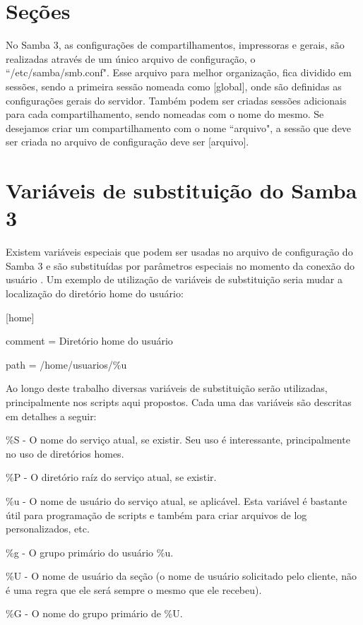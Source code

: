 \section{Seções}

No Samba 3, as configurações de compartilhamentos, impressoras e gerais, são realizadas através de um único arquivo de configuração, o ``/etc/samba/smb.conf". Esse arquivo para melhor organização, fica dividido em sessões, sendo a primeira sessão nomeada como [global], onde são definidas as configurações gerais do servidor. Também podem ser criadas sessões adicionais para cada compartilhamento, sendo nomeadas com o nome do mesmo. Se desejamos criar um compartilhamento com o nome ``arquivo", a sessão que deve ser criada no arquivo de configuração deve ser [arquivo].

\section{Variáveis de substituição do Samba 3}

Existem variáveis especiais que podem ser usadas no arquivo de configuração do Samba 3 e são substituídas por parâmetros especiais no momento da conexão do usuário \cite{FOCA}. Um exemplo de utilização de variáveis de substituição seria mudar a localização do diretório home do usuário:

     [home]

      comment = Diretório home do usuário

      path = /home/usuarios/\%u

Ao longo deste trabalho diversas variáveis de substituição serão utilizadas, principalmente nos scripts aqui propostos. Cada uma das variáveis são descritas em detalhes a seguir:

\%S - O nome do serviço atual, se existir. Seu uso é interessante, principalmente no uso de diretórios homes.

\%P - O diretório raíz do serviço atual, se existir.

\%u - O nome de usuário do serviço atual, se aplicável. Esta variável é bastante útil para programação de scripts e também para criar arquivos de log personalizados, etc.

\%g - O grupo primário do usuário \%u.

\%U - O nome de usuário da seção (o nome de usuário solicitado pelo cliente, não é uma regra que ele será sempre o mesmo que ele recebeu).

\%G - O nome do grupo primário de \%U.

